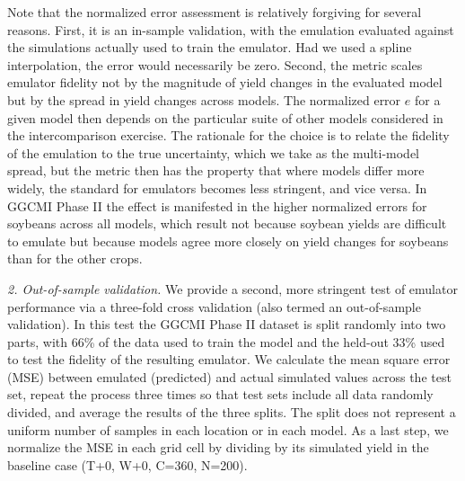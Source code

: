 \documentclass[gmd, manuscript]{copernicus} %
\begin{document}
Note that the normalized error assessment is relatively forgiving for several reasons. 
First, it is an in-sample validation, with the emulation evaluated against the simulations actually used to train the emulator. 
Had we used a spline interpolation, the error would necessarily be zero. 
Second, the metric scales emulator fidelity not by the magnitude of yield changes in the evaluated model but by the spread in yield changes across models. 
The normalized error $e$ for a given model then depends on the particular suite of other models considered in the intercomparison exercise.  
The rationale for the choice is to relate the fidelity of the emulation to the true uncertainty, which we take as the multi-model spread, but  
the metric then has the property that where models differ more widely, the standard for emulators becomes less stringent, and vice versa.
In GGCMI Phase II the effect is manifested in the higher normalized errors for soybeans across all models, which result not because soybean yields are difficult to emulate but because models agree more closely on yield changes for soybeans than for the other crops.

\smallskip
\textit{2. Out-of-sample validation.} We provide a second, more stringent test of emulator performance via a three-fold cross validation (also termed an out-of-sample validation). 
In this test the GGCMI Phase II dataset is split randomly into two parts, with 66\% of the data used to train the model and the held-out 33\% used to test the fidelity of the resulting emulator.
We calculate the mean square error (MSE) between emulated (predicted) and actual simulated values across the test set, repeat the process three times so that test sets include all data randomly divided, and average the results of the three splits. 
The split does not represent a uniform number of samples in each location or in each model.
As a last step, we normalize the MSE in each grid cell by dividing by its simulated yield in the baseline case (T+0, W+0, C=360, N=200). 
\end{document}
